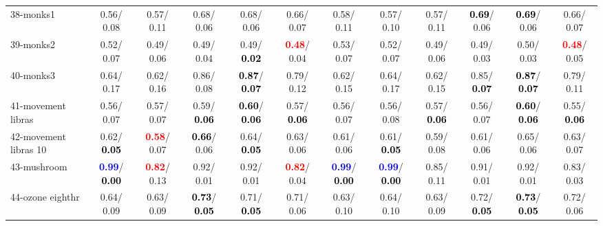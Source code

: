 \begin{table}[h]
\begin{center}
{\begin{tabular}{lc|c|c|c|c|c|c|c|c|c|c}
38-monks1 &   0.56/  0.08 &   0.57/  0.11 &   0.68/  0.06 &   0.68/  0.06 &   0.66/  0.07 &   0.58/  0.11 &   0.57/  0.10 &   0.57/  0.11 & \textcolor{black}{\textbf{  0.69}}/  0.06 & \textcolor{black}{\textbf{  0.69}}/  0.06 &   0.66/  0.07 \\
39-monks2 &   0.52/  0.07 &   0.49/  0.06 &   0.49/  0.04 &   0.49/\textcolor{black}{\textbf{  0.02}} & \textcolor{red}{\textbf{  0.48}}/  0.04 &   0.53/  0.07 &   0.52/  0.07 &   0.49/  0.06 &   0.49/  0.03 &   0.50/  0.03 & \textcolor{red}{\textbf{  0.48}}/  0.05 \\ \hline
40-monks3 &   0.64/  0.17 &   0.62/  0.16 &   0.86/  0.08 & \textcolor{black}{\textbf{  0.87}}/\textcolor{black}{\textbf{  0.07}} &   0.79/  0.12 &   0.62/  0.15 &   0.64/  0.17 &   0.62/  0.15 &   0.85/\textcolor{black}{\textbf{  0.07}} & \textcolor{black}{\textbf{  0.87}}/\textcolor{black}{\textbf{  0.07}} &   0.79/  0.11 \\
41-movement libras &   0.56/  0.07 &   0.57/  0.07 &   0.59/\textcolor{black}{\textbf{  0.06}} & \textcolor{black}{\textbf{  0.60}}/\textcolor{black}{\textbf{  0.06}} &   0.57/\textcolor{black}{\textbf{  0.06}} &   0.56/  0.07 &   0.56/  0.08 &   0.57/\textcolor{black}{\textbf{  0.06}} &   0.56/  0.07 & \textcolor{black}{\textbf{  0.60}}/\textcolor{black}{\textbf{  0.06}} &   0.55/\textcolor{black}{\textbf{  0.06}} \\
42-movement libras 10 &   0.62/\textcolor{black}{\textbf{  0.05}} & \textcolor{red}{\textbf{  0.58}}/  0.07 & \textcolor{black}{\textbf{  0.66}}/  0.06 &   0.64/\textcolor{black}{\textbf{  0.05}} &   0.63/  0.06 &   0.61/  0.06 &   0.61/\textcolor{black}{\textbf{  0.05}} &   0.59/  0.08 &   0.61/  0.06 &   0.65/  0.06 &   0.63/  0.07 \\
43-mushroom & \textcolor{blue}{\textbf{  0.99}}/\textcolor{black}{\textbf{  0.00}} & \textcolor{red}{\textbf{  0.82}}/  0.13 &   0.92/  0.01 &   0.92/  0.01 & \textcolor{red}{\textbf{  0.82}}/  0.04 & \textcolor{blue}{\textbf{  0.99}}/\textcolor{black}{\textbf{  0.00}} & \textcolor{blue}{\textbf{  0.99}}/\textcolor{black}{\textbf{  0.00}} &   0.85/  0.11 &   0.91/  0.01 &   0.92/  0.01 &   0.83/  0.03 \\
44-ozone eighthr &   0.64/  0.09 &   0.63/  0.09 & \textcolor{black}{\textbf{  0.73}}/\textcolor{black}{\textbf{  0.05}} &   0.71/\textcolor{black}{\textbf{  0.05}} &   0.71/  0.06 &   0.63/  0.10 &   0.64/  0.10 &   0.63/  0.09 &   0.72/\textcolor{black}{\textbf{  0.05}} & \textcolor{black}{\textbf{  0.73}}/\textcolor{black}{\textbf{  0.05}} &   0.72/  0.06 \\

\end{tabular}}
\end{center}
\end{table}
